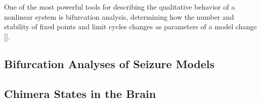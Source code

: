 One of the most powerful tools for describing the qualitative behavior of a nonlinear system is bifurcation analysis, determining how the number and stability of fixed points and limit cycles changes as parameters of a model change [].
\subsection{Bifurcation Analyses of Seizure Models}
\label{sec:lit_review_bifurcation}


\subsection{Chimera States in the Brain}
\label{sec:lit_review_chimera}

